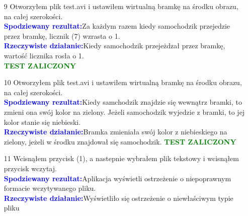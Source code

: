 \documentclass[11pt,a4paper]{article}
\newcommand{\testA}{\textcolor{blue}{\textbf{Spodziewany rezultat:\quad}}}
\newcommand{\testB}{\textcolor{blue}{\textbf{Rzeczywiste działanie:\quad}}}
\newcommand{\testT}{\textcolor{green}{\large{\textbf{TEST ZALICZONY}}}}
\begin{document}
\begin{enumerate}
Uruchomiłem aplikację oraz odtworzyłem plik test.avi. Nastepnie, wcisnąłem kla. T, kla. S i kla. W\\
\testA Pojawi się wirtualna bramka, która przesunie się w dół, a nastepnie wróci do swojeje pozycji.\\
\testB Niebieska bramka przesunęła w dół,a  na następnie w górę.

Uruchomiłem aplikację oraz odtworzyłem plik test.avi. Nastepnie, wcisnąłem kla. T i kla. R\\
\testA Pojawi się wirtualna bramka, która obróci się o 90 stopni.\\
\testB Niebieska bramka z pozycji horyzontalnej przeszła w pozycję pionową.

\testT

\item[9] Otworzyłem plik test.avi i ustawiłem wirtualną bramkę na środku obrazu, na całej szerokości.\\
\testA Za każdym razem kiedy samochodzik przejedzie przez bramkę, licznik (7) wzrasta o 1.\\
\testB Kiedy samochodzik przejeżdzał przez bramkę, wartość licznika rosła o 1.\\
\testT

\item[10]  Otworzyłem plik test.avi i ustawiłem wirtualną bramkę na środku obrazu, na całej szerokości.\\
\testA Kiedy samchodzik znajdzie się wewnątrz bramki, to zmieni ona swój kolor na zielony. Jeżeli samochodzik wyjedzie z bramki, to jej kolor stanie się niebieski.\\
\testB Bramka zmieniała swój kolor z niebieskiego na zielony, jeżeli w środku znajdował się samochodzik.
\testT
\item[11]
Wcisnąłem przycisk (1), a nastepnie wybrałem plik tekstowy i wcisnąłem przycisk wczytaj.\\
\testA Aplikacja wyświetli ostrzeżenie o niepoprawnym formacie wczytywanego pliku.\\
\testB Wyświetliło się ostrzeżenie o niewłaściwym typie pliku
\end{enumerate}
\end{document}
